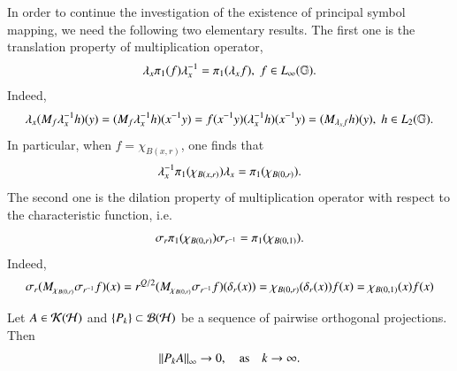 \documentclass[leqno]{amsart}
\begin{document}
	
	In order to continue the investigation of the existence of principal symbol mapping, we need the following two elementary results.
	The first one is the translation property of multiplication operator,
	\begin{align}\label{multiplication-conjugate}
		\lambda_{x}\pi_{1}(f)\lambda_{x}^{-1}=\pi_{1}(\lambda_{x}f),\; f\in L_{\infty}(\mathbb{G}).
	\end{align}
	Indeed,
	\begin{align*}
		\lambda_{x}(M_{f}\lambda_{x}^{-1} h)(y)
		=(M_{f}\lambda_{x}^{-1} h)(x^{-1} y)
		=f(x^{-1} y) (\lambda_{x}^{-1} h)(x^{-1} y)
		=(M_{\lambda_{x}f}h)(y),\; h\in L_{2}(\mathbb{G}).
	\end{align*}
	In particular, when $f=\chi_{B(x,r)}$, one finds that
	\begin{align}\label{chibox}
		\lambda_{x}^{-1}\pi_{1}(\chi_{B(x,r)})\lambda_{x}=\pi_{1}(\chi_{B(0,r)}).
	\end{align}
	The second one is the dilation property of multiplication operator with respect to the characteristic function, i.e.
	\begin{align}\label{sgmaboo}
		\sigma_{r}\pi_{1}(\chi_{B(0,r)})\sigma_{r^{-1}}=\pi_{1}(\chi_{B(0,1)}).
	\end{align}
	Indeed, 
	\begin{align*}
		\sg{r}(M_{\chi_{B(0,r)}}\sg{r\rp}f)(x)
		=r^{Q/2}(M_{\chi_{B(0,r)}}\sg{r\rp}f)(\dl{r}(x))
		=\chi_{B(0,r)}(\dl{r}(x))f(x)
		=\chi_{B(0,1)}(x)f(x)%
	\end{align*}
	
	
	
	\begin{lemma}\label{projection-compact}
		\cite[Lemma 4.1]{DAO2}
		Let $A\in{\mathcal K}({\mathcal H})$ and $\{P_{k}\}\subset{\mathcal B}({\mathcal H})$ be a sequence of pairwise orthogonal projections. Then $$\left\| P_{k}A \right\|_{\infty}\rightarrow0,\quad{\rm as}\quad k\rightarrow\infty.$$
	\end{lemma}
	
\end{document}
